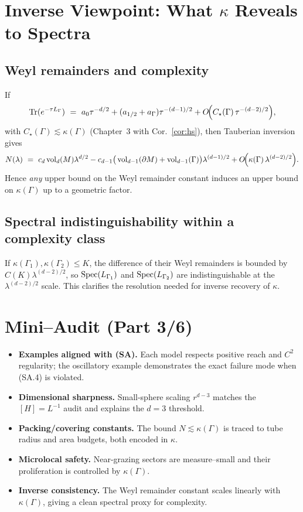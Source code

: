 \section{Inverse Viewpoint: What $\kappa$ Reveals to Spectra}
\label{sec:inverse-quantitative}

\subsection{Weyl remainders and complexity}
If
\[
\Tr(e^{-\tau L_\Gamma})\ =\ a_0\tau^{-d/2}+(a_{1/2}+a_\Gamma)\tau^{-(d-1)/2}+O\!\Big(C_\star(\Gamma)\,\tau^{-(d-2)/2}\Big),
\]
with $C_\star(\Gamma)\lesssim \kappa(\Gamma)$ (Chapter~3 with Cor.~\ref{cor:hs}), then Tauberian inversion gives
\[
N(\lambda)\ =\ c_d \operatorname{vol}_d(M)\lambda^{d/2}-c_{d-1}\big(\operatorname{vol}_{d-1}(\partial M)+\operatorname{vol}_{d-1}(\Gamma)\big)\lambda^{(d-1)/2}+O\!\Big(\kappa(\Gamma)\,\lambda^{(d-2)/2}\Big).
\]
Hence \emph{any} upper bound on the Weyl remainder constant induces an upper bound on $\kappa(\Gamma)$ up to a geometric factor.

\subsection{Spectral indistinguishability within a complexity class}
If $\kappa(\Gamma_1),\kappa(\Gamma_2)\le K$, the difference of their Weyl remainders is bounded by $C(K)\lambda^{(d-2)/2}$, so $\operatorname{Spec}(L_{\Gamma_1})$ and $\operatorname{Spec}(L_{\Gamma_2})$ are indistinguishable at the $\lambda^{(d-2)/2}$ scale. This clarifies the resolution needed for inverse recovery of $\kappa$.

\section{Mini–Audit (Part 3/6)}
\label{sec:audit-part3}

\begin{itemize}
\item \textbf{Examples aligned with (SA).} Each model respects positive reach and $C^2$ regularity; the oscillatory example demonstrates the exact failure mode when (SA.4) is violated.
\item \textbf{Dimensional sharpness.} Small-sphere scaling $r^{d-3}$ matches the $[H]=L^{-1}$ audit and explains the $d=3$ threshold.
\item \textbf{Packing/covering constants.} The bound $N\lesssim \kappa(\Gamma)$ is traced to tube radius and area budgets, both encoded in $\kappa$.
\item \textbf{Microlocal safety.} Near-grazing sectors are measure–small and their proliferation is controlled by $\kappa(\Gamma)$.
\item \textbf{Inverse consistency.} The Weyl remainder constant scales linearly with $\kappa(\Gamma)$, giving a clean spectral proxy for complexity.
\end{itemize}

